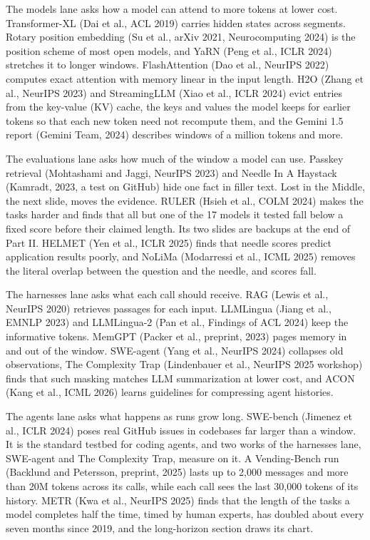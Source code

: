 The models lane asks how a model can attend to more tokens at lower cost. Transformer-XL (Dai et al., ACL 2019) carries hidden states across segments. Rotary position embedding (Su et al., arXiv 2021, Neurocomputing 2024) is the position scheme of most open models, and YaRN (Peng et al., ICLR 2024) stretches it to longer windows. FlashAttention (Dao et al., NeurIPS 2022) computes exact attention with memory linear in the input length. H2O (Zhang et al., NeurIPS 2023) and StreamingLLM (Xiao et al., ICLR 2024) evict entries from the key-value (KV) cache, the keys and values the model keeps for earlier tokens so that each new token need not recompute them, and the Gemini 1.5 report (Gemini Team, 2024) describes windows of a million tokens and more.

The evaluations lane asks how much of the window a model can use. Passkey retrieval (Mohtashami and Jaggi, NeurIPS 2023) and Needle In A Haystack (Kamradt, 2023, a test on GitHub) hide one fact in filler text. Lost in the Middle, the next slide, moves the evidence. RULER (Hsieh et al., COLM 2024) makes the tasks harder and finds that all but one of the 17 models it tested fall below a fixed score before their claimed length. Its two slides are backups at the end of Part II. HELMET (Yen et al., ICLR 2025) finds that needle scores predict application results poorly, and NoLiMa (Modarressi et al., ICML 2025) removes the literal overlap between the question and the needle, and scores fall.

The harnesses lane asks what each call should receive. RAG (Lewis et al., NeurIPS 2020) retrieves passages for each input. LLMLingua (Jiang et al., EMNLP 2023) and LLMLingua-2 (Pan et al., Findings of ACL 2024) keep the informative tokens. MemGPT (Packer et al., preprint, 2023) pages memory in and out of the window. SWE-agent (Yang et al., NeurIPS 2024) collapses old observations, The Complexity Trap (Lindenbauer et al., NeurIPS 2025 workshop) finds that such masking matches LLM summarization at lower cost, and ACON (Kang et al., ICML 2026) learns guidelines for compressing agent histories.

The agents lane asks what happens as runs grow long. SWE-bench (Jimenez et al., ICLR 2024) poses real GitHub issues in codebases far larger than a window. It is the standard testbed for coding agents, and two works of the harnesses lane, SWE-agent and The Complexity Trap, measure on it. A Vending-Bench run (Backlund and Petersson, preprint, 2025) lasts up to 2,000 messages and more than 20M tokens across its calls, while each call sees the last 30,000 tokens of its history. METR (Kwa et al., NeurIPS 2025) finds that the length of the tasks a model completes half the time, timed by human experts, has doubled about every seven months since 2019, and the long-horizon section draws its chart.

